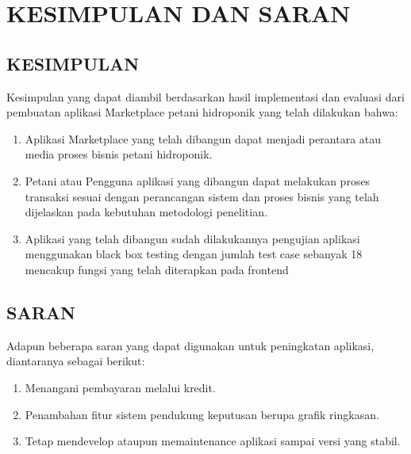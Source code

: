 \fancyhf{} 
\fancyfoot[C]{\thepage}
\chapter{KESIMPULAN DAN SARAN}

\section{\uppercase{KESIMPULAN}}
Kesimpulan yang dapat diambil berdasarkan hasil implementasi dan evaluasi dari pembuatan aplikasi Marketplace petani hidroponik yang telah dilakukan bahwa:
\begin{enumerate}
    \item Aplikasi Marketplace yang telah dibangun dapat menjadi perantara atau media proses bisnis petani hidroponik.
    \item Petani atau Pengguna aplikasi yang dibangun dapat melakukan proses transaksi sesuai dengan perancangan sistem dan proses bisnis yang telah dijelaskan pada kebutuhan metodologi penelitian.
    \item Aplikasi yang telah dibangun sudah dilakukannya pengujian aplikasi menggunakan black box testing dengan jumlah test case sebanyak 18 mencakup fungsi yang telah diterapkan pada frontend
    
\end{enumerate}

\section{\uppercase{SARAN}}
Adapun beberapa saran yang dapat digunakan untuk peningkatan aplikasi, diantaranya sebagai berikut:
\begin{enumerate}
    \item Menangani pembayaran melalui kredit.
    \item Penambahan fitur sistem pendukung keputusan berupa grafik ringkasan.
    \item Tetap mendevelop ataupun memaintenance aplikasi sampai versi yang stabil.
    
\end{enumerate}


\begin{comment}

\end{comment}